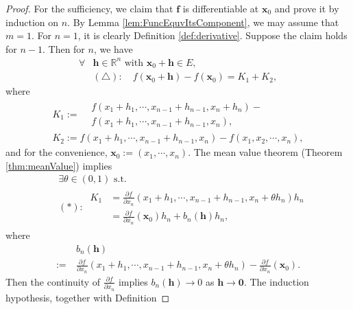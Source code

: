 \begin{proof}
  For the sufficiency,
  we claim that $\mathbf{f}$ is differentiable at $\mathbf{x}_{0}$ and
  prove it by induction on $n$. By Lemma \ref{lem:FuncEquvItsComponent},
  we may assume that $m=1$.
  For $n=1$, it is clearly Definition \ref{def:derivative}.
  Suppose the claim holds for $n-1$. Then for $n$, we have
  \begin{align*}
    \forall &\mathbf{h}\in \mathbb{R}^{n}\text{ with }
              \mathbf{x}_{0}+\mathbf{h}\in E,\\
    &(\triangle):\quad
    f(\mathbf{x}_{0}+\mathbf{h})-f(\mathbf{x}_{0})
    =K_{1}+K_{2},
  \end{align*}
  where
  \begin{displaymath}
    \begin{array}{l}
      K_{1}:=
      \begin{array}{ll}
        &f(x_{1}+h_{1},\cdots,x_{n-1}+h_{n-1},x_{n}+h_{n})-\\
        &f(x_{1}+h_{1},\cdots,x_{n-1}+h_{n-1},x_{n}),
      \end{array}\\
       K_{2}:=f(x_{1}+h_{1},\cdots,x_{n-1}+h_{n-1},x_{n})-
           f(x_{1},x_{2},\cdots,x_{n}),
    \end{array}
  \end{displaymath}
  and for the convenience, $\mathbf{x}_{0}:=(x_{1},\cdots, x_{n})$.
  The mean value theorem (Theorem \ref{thm:meanValue}) implies
  \begin{align*}
    &\ \exists \theta\in (0,1)\text{ s.t. }\\
    &\ (*):\
    \begin{array}{ll}
       K_{1}
    &=\frac{\partial f}{\partial x_{n}}(x_{1}+h_{1},\cdots,
      x_{n-1}+h_{n-1},x_{n}+\theta h_{n})h_{n}\\
    &=\frac{\partial f}{\partial x_{n}}(\mathbf{x}_{0})h_{n}
      +b_{n}(\mathbf{h})h_{n},
    \end{array}
  \end{align*}
  where
  \begin{align*}
    &\ b_{n}(\mathbf{h})\\
    :=&\ \frac{\partial f}{\partial x_{n}}(x_{1}+h_{1},\cdots,
    x_{n-1}+h_{n-1},x_{n}+\theta h_{n})-
    \frac{\partial f}{\partial x_{n}}(\mathbf{x}_{0}).
  \end{align*}
  Then the continuity of $\frac{\partial f}{\partial x_{n}}$ implies
  $b_{n}(\mathbf{h})\rightarrow 0$ as $\mathbf{h}\rightarrow \mathbf{0}$.   
  The induction hypothesis, together with Definition

\end{proof}
